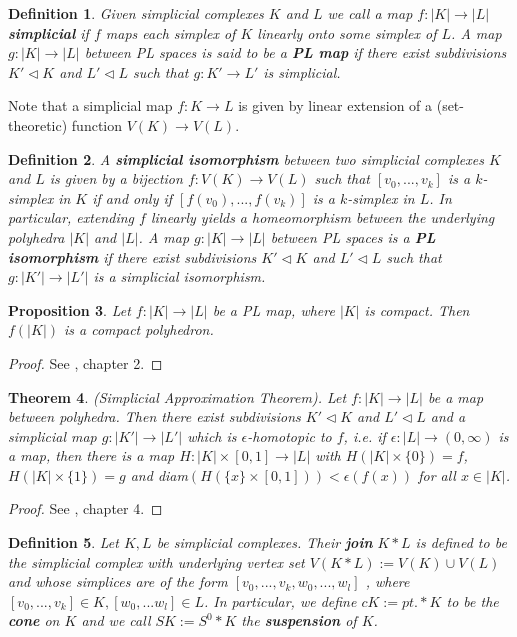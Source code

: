 \documentclass{scrreprt}
\newtheorem{prop}{Proposition}[chapter]
\newtheorem{theorem}[prop]{Theorem}
\newtheorem{definition}[prop]{Definition}
\begin{document}
\begin{definition}
Given simplicial complexes $K$ and $L$ we call a map $f: |K| \to |L|$ \textbf{simplicial} if $f$ maps each simplex of $K$ linearly onto some simplex of $L$. A map \\ $g: |K| \to |L|$ between PL spaces  is said to be a \textbf{PL map} if there exist subdivisions $K' \lhd K$ and $L' \lhd L$ such that $g: K' \to L' $ is simplicial.
\end{definition}
Note that a simplicial map $f: K \to L$ is given by linear extension of a (set-theoretic) function $V(K) \to V(L)$.

\begin{definition}
A \textbf{simplicial isomorphism} between two simplicial complexes $K$ and $L$ is given by a bijection $f : V(K) \to V(L)$ such that $[v_0,...,v_k]$ is a $k$-simplex in $K$ if and only if $[f(v_0),...,f(v_k)]$ is a $k$-simplex in $L$. In particular, extending $f$ linearly yields a homeomorphism between the underlying polyhedra $|K|$ and $|L|$. A map $g: |K| \to |L|$ between PL spaces is a \textbf{PL isomorphism} if there exist subdivisions $K' \lhd K$ and $L' \lhd L$ such that $g: |K'| \to |L'|$ is a simplicial isomorphism.
\end{definition}

\begin{prop}\label{imageplmappolyhedron}
Let $f: |K| \to |L|$ be a PL map, where $|K|$ is compact. Then $f(|K|)$ is a compact polyhedron.
\end{prop}

\begin{proof}
See \cite{pltopo}, chapter 2.
\end{proof}

\begin{theorem}(Simplicial Approximation Theorem).
Let $f: |K| \to |L|$ be a map between polyhedra. Then there exist subdivisions $K' \lhd K$ and $L' \lhd L$ and a simplicial map $g: |K'| \to |L'|$ which is $\epsilon$-homotopic to $f$, i.e. if $\epsilon: |L| \to (0,\infty)$ is a map, then there is a map $H: |K| \times [0,1] \to |L|$ with $H(|K| \times \{ 0\})=f$, $H(|K| \times \{ 1\})=g$ and diam$(H(\{ x \} \times [0,1])) < \epsilon(f(x))$ for all $x \in |K|$.
\end{theorem}

\begin{proof}
See \cite{lecturenotes}, chapter 4.
\end{proof}

\begin{definition}
Let $K,L$ be simplicial complexes. Their \textbf{join} $K*L$ is defined to be the simplicial complex with underlying vertex set $V(K*L):=V(K) \cup V(L)$ and whose simplices are of the form $[v_0,...,v_k,w_0,...,w_l]$ , where $[v_0,...,v_k] \in K, [w_0,...w_l] \in L$. In particular, we define $cK := pt. * K$ to be the \textbf{cone} on $K$ and we call $SK:=S^0 * K$ the \textbf{suspension} of $K$.
\end{definition}
\end{document}
